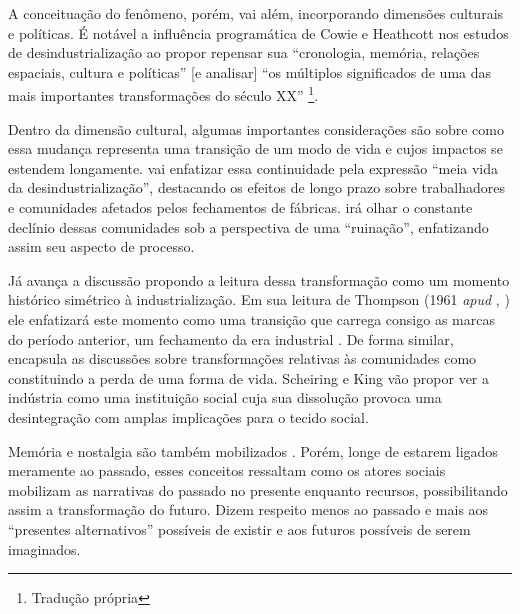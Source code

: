 A conceituação do fenômeno, porém, vai além, incorporando dimensões
culturais e políticas. É notável a influência programática de Cowie e
Heathcott nos estudos de desindustrialização ao propor repensar sua
``cronologia, memória, relações espaciais, cultura e políticas'' {[}e
analisar{]} ``os múltiplos significados de uma das mais importantes
transformações do século XX''
\citep[p.~2]{cowie_beyond_2003}\footnote{Tradução própria}.

Dentro da dimensão cultural, algumas importantes considerações são
sobre como essa mudança representa uma transição de um modo de vida e
cujos impactos se estendem longamente. \citet{linkon_half-life_2018} vai enfatizar
essa continuidade pela expressão ``meia vida da desindustrialização'',
destacando os efeitos de longo prazo sobre trabalhadores e comunidades
afetados pelos fechamentos de fábricas. \citet{mah_industrial_2012} irá olhar o
constante declínio dessas comunidades sob a perspectiva de uma
``ruinação'', enfatizando assim seu aspecto de processo.

Já \citet{strangleman_deindustrialisation_2017} avança a
discussão propondo a leitura dessa transformação como um momento
histórico simétrico à industrialização. Em sua leitura de Thompson
(1961 \emph{apud} \citeauthor{strangleman_deindustrialisation_2017}, \citeyear{strangleman_deindustrialisation_2017}) ele enfatizará este
momento como uma transição que carrega consigo as marcas do período
anterior, um fechamento da era industrial
\citep[p.~467]{strangleman_deindustrialisation_2017}. De forma similar, \citet[p.~694]{hoekstra_iconic_2020}
encapsula as discussões sobre transformações relativas às comunidades
como constituindo a perda de uma forma de vida. Scheiring e King
\citep[p.~144]{scheiring_deindustrialization_2023}vão propor ver a indústria como uma instituição social
cuja sua dissolução provoca uma desintegração com amplas implicações
para o tecido social.

Memória e nostalgia são também mobilizados
\citep{clark_voices_2020,clarke_closing_2015,lewis_regenerating_2016,nettleingham_beyond_2019}. Porém, longe de
estarem ligados meramente ao passado, esses conceitos ressaltam como os
atores sociais mobilizam as narrativas do passado no presente enquanto
recursos, possibilitando assim a transformação do futuro. Dizem respeito
menos ao passado e mais aos ``presentes alternativos''
\citep[p.~119--123]{clarke_closing_2015} possíveis de existir e aos futuros possíveis de serem
imaginados.

